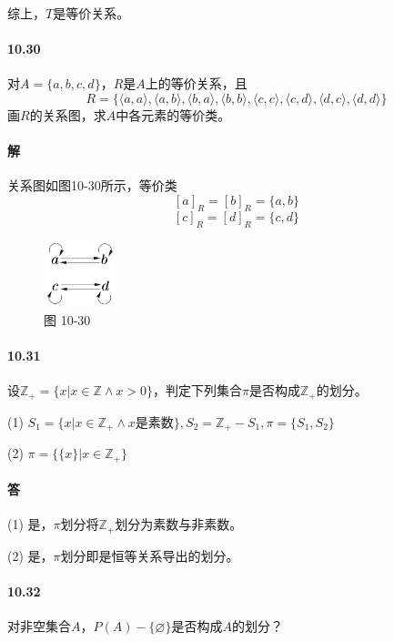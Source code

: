 \documentclass[UTF8]{ctexart}
\newcommand{\sinteger}{\mathbb{Z}}
\begin{document}
    综上，$T$是等价关系。

\paragraph{10.30} \label{10.30}
    对$A= \{ a,b,c,d \} $，$R$是$A$上的等价关系，且
    $$R = \{ \langle a,a \rangle , \langle a,b \rangle , \langle b,a \rangle , \langle b,b \rangle , \langle c,c \rangle , \langle c,d \rangle , \langle d,c \rangle , \langle d,d \rangle \} $$
    画$R$的关系图，求$A$中各元素的等价类。

\paragraph{解}
    关系图如图10-30所示，等价类
    $$[a]_R = [b]_R = \{a,b\}$$
    $$[c]_R = [d]_R = \{c,d\}$$

    \begin{figure}[!htb]
        \centering
        \includegraphics[width=0.188\textwidth]{10-30.png}
        \caption*{图 10-30}
    \end{figure}

\paragraph{10.31} \label{10.31}
    设$\sinteger_+= \{ x | x \in \sinteger \land x > 0 \} $，判定下列集合$\pi$是否构成$\sinteger_+$的划分。
    
    (1) $S_1 = \{ x| x \in \sinteger_+ \land x \text{是素数} \}, S_2 = \sinteger_+ - S_1, \pi = \{S_1, S_2 \} $

    (2) $\pi = \{ \{ x \} |x \in \sinteger_+ \} $

\paragraph{答}
    (1) 是，$\pi$划分将$\sinteger_+$划分为素数与非素数。

    (2) 是，$\pi$划分即是恒等关系导出的划分。

\paragraph{10.32} \label{10.32}
    对非空集合$A$，$P(A) - \{\varnothing\}$是否构成$A$的划分？
\end{document}
